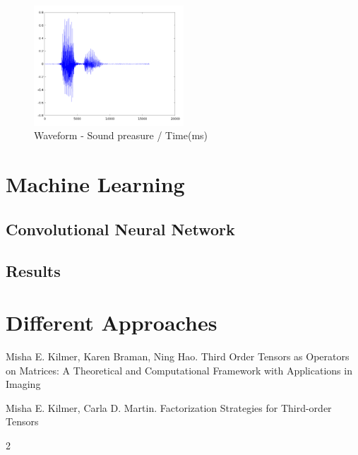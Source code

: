 \documentclass[twoside]{article}
\begin{document}
\begin{multicols}{2}
\begin{figure}[h]
	\centering
	\includegraphics[width=0.5\textwidth]{happy-read}
	\caption{Waveform - Sound preasure / Time(ms)}
	\label{img:pocetnoStanje}
\end{figure}
\section{Machine Learning}

\subsection{Convolutional Neural Network}

\subsection{Results}

\section{Different Approaches}





\begin{thebibliography}{99}

Misha E. Kilmer, Karen Braman, Ning Hao.
\newblock Third Order Tensors as Operators on Matrices: A
Theoretical and Computational Framework with
Applications in Imaging

Misha E. Kilmer, Carla D. Martin.
\newblock Factorization Strategies for Third-order Tensors

 
\end{thebibliography}


\end{multicols}{2}
\end{document}
